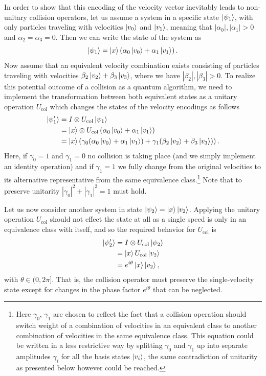 In order to show that this encoding of the velocity vector inevitably leads to non-unitary collision operators, let us assume a system in a specific state $\ket{\psi_1}$, with only particles traveling with velocities $\ket{v_0}$ and $\ket{v_1}$, meaning that $|\alpha_0|,|\alpha_1| > 0$ and $\alpha_2=\alpha_3=0$. Then we can write the state of the system as
\begin{equation}\label{eq:sys1}
\ket{\psi_1} = \ket{x}\left (\alpha_0\ket{v_0} + \alpha_1\ket{v_1} \right ).
\end{equation}
Now assume that an equivalent velocity combination exists consisting of particles traveling with velocities $\beta_2\ket{v_2} + \beta_3\ket{v_3}$, where we have $|\beta_2|,|\beta_3| > 0$. To realize this potential outcome of a collision as a quantum algorithm, we need to implement the transformation between both equivalent states as a unitary operation
$U_\text{col}$ which changes the states of the velocity encodings as follows
\begin{equation}
\begin{split}
     \ket{\psi_1^\prime} &= I \otimes U_\text{col} \ket{\psi_1} \\& = \ket{x}\otimes U_\text{col}\left (\alpha_0\ket{v_0} + \alpha_1\ket{v_1} \right ) \\ & =\ket{x} \left ( \gamma_0(\alpha_0\ket{v_0} + \alpha_1\ket{v_1}) + \gamma_1(\beta_2\ket{v_2} + \beta_3\ket{v_3})  \right ).
\end{split}
\end{equation}
Here, if $\gamma_0=1$ and $\gamma_1=0$ no collision is taking place (and we simply implement an identity operation) and if $\gamma_1=1$ we fully change from the original velocities to its alternative representative from the same equivalence class.\footnote{Here $\gamma_0$, $\gamma_1$ are chosen to reflect the fact that a collision operation should switch weight of a combination of velocities in an equivalent class to another combination of velocities in the same equivalence class. This equation could be written in a less restrictive way by splitting $\gamma_0$ and $\gamma_1$ up into separate amplitudes $\gamma_i$ for all the basis states $\ket{v_i}$, the same contradiction of unitarity as presented below however could be reached.} Note that to preserve unitarity $|\gamma_0|^2+|\gamma_1|^2=1$ must hold.

Let us now consider another system in state $\ket{\psi_2} = \ket{x}\ket{v_2}$. Applying the unitary operation $U_\text{col}$ should not effect the state at all as a single speed is only in an equivalence class with itself, and so the required behavior for $U_\text{col}$ is
\begin{equation}\label{eq:sys2_end}
\begin{split}
     \ket{\psi_2^\prime} &=I \otimes U_\text{col}\ket{\psi_2} \\ & =  \ket{x}U_\text{col}\ket{v_2} \\ & = e^{i\theta}\ket{x}\ket{v_2},
\end{split}
\end{equation}
with $\theta\in (0,2\pi]$. That is, the collision operator must preserve the single-velocity state except for changes in the phase factor $e^{i\theta}$ that can be neglected.

